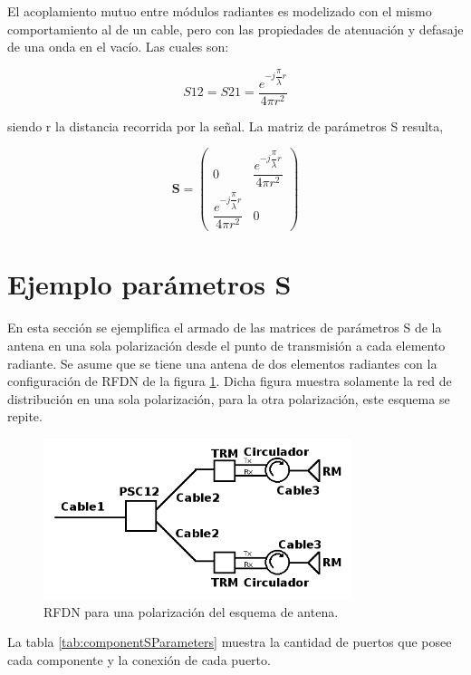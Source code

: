 El acoplamiento mutuo entre módulos radiantes es modelizado con el mismo comportamiento al de un cable, pero con las
propiedades de atenuación y defasaje de una onda en el vacío. Las cuales son:

\begin{equation}
	S12 = S21 = \dfrac{e^{-j\dfrac{\pi}{\lambda}r}}{4\pi r^2}
\end{equation}

siendo r la distancia recorrida por la señal. La matriz de parámetros S resulta,

$$
\mathbf{S} = \begin{pmatrix} 0 & \dfrac{e^{-j\dfrac{\pi}{\lambda}r}}{4\pi r^2}\\\dfrac{e^{-j\dfrac{\pi}{\lambda}r}}{4\pi r^2} & 0\end{pmatrix}
$$

\section{Ejemplo parámetros S}

En esta sección se ejemplifica el armado de las matrices de parámetros S de la antena en una sola polarización desde el punto 
de transmisión a cada elemento radiante. Se asume que se tiene una antena de dos elementos radiantes con la configuración de 
RFDN de la figura \ref{fig:antennaS}. Dicha figura muestra solamente la red de distribución en una sola polarización, para la 
otra polarización, este esquema se repite.

\begin{figure}[H]
 \centering
 \includegraphics[width=9cm]{gfx/RFDN.png}
 \caption{RFDN para una polarización del esquema de antena.}
 \label{fig:antennaS}
\end{figure}

La tabla \ref{tab:componentSParameters} muestra la cantidad de puertos que posee cada componente y la conexión de cada puerto.

